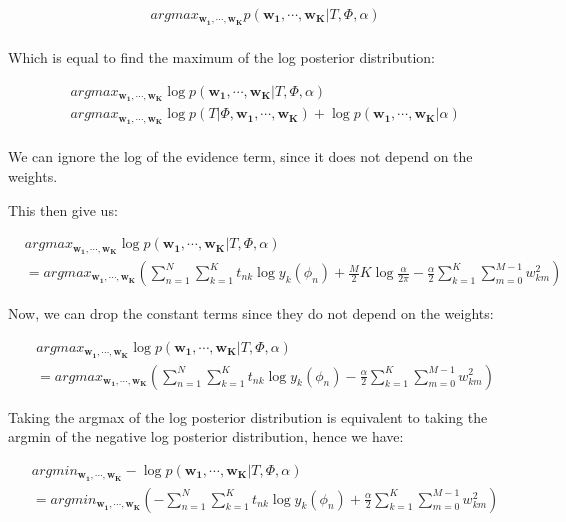 \documentclass[12pt,a4paper,oneside]{paper}
\begin{document}
\begin{align*}
    &argmax_{\bm{w_1}, \cdots, \bm{w_K}} p(\bm{w_1}, \cdots, \bm{w_K} | T, \Phi, \alpha) \\
\end{align*}

Which is equal to find the maximum of the log posterior distribution:

\begin{align*}
    &argmax_{\bm{w_1}, \cdots, \bm{w_K}} \log p(\bm{w_1}, \cdots, \bm{w_K} | T, \Phi, \alpha) \\
    &argmax_{\bm{w_1}, \cdots, \bm{w_K}} \log p(T | \Phi, \bm{w_1}, \cdots, \bm{w_K}) + \log p(\bm{w_1}, \cdots, \bm{w_K} | \alpha) \\
\end{align*}

We can ignore the log of the evidence term, since it does not depend on the weights.

This then give us: 

\begin{align*}
    &argmax_{\bm{w_1}, \cdots, \bm{w_K}} \log p(\bm{w_1}, \cdots, \bm{w_K} | T, \Phi, \alpha) \\
    &= argmax_{\bm{w_1}, \cdots, \bm{w_K}} \left(\sum_{n=1}^{N} \sum_{k=1}^{K} t_{nk} \log y_k(\phi_n) + \frac{M}{2} K \log \frac{\alpha}{2\pi} - \frac{\alpha}{2} \sum_{k=1}^{K} \sum_{m=0}^{M - 1} w_{km}^2\right)
\end{align*}


Now, we can drop the constant terms since they do not depend on the weights: 

\begin{align*}
    &argmax_{\bm{w_1}, \cdots, \bm{w_K}} \log p(\bm{w_1}, \cdots, \bm{w_K} | T, \Phi, \alpha) \\
    &= argmax_{\bm{w_1}, \cdots, \bm{w_K}} \left(\sum_{n=1}^{N} \sum_{k=1}^{K} t_{nk} \log y_k(\phi_n) - \frac{\alpha}{2} \sum_{k=1}^{K} \sum_{m=0}^{M - 1} w_{km}^2\right)
\end{align*}

Taking the argmax of the log posterior distribution is equivalent to taking the argmin of the negative log posterior distribution, hence we have:

\begin{align*}
    &argmin_{\bm{w_1}, \cdots, \bm{w_K}} -\log p(\bm{w_1}, \cdots, \bm{w_K} | T, \Phi, \alpha) \\
    &= argmin_{\bm{w_1}, \cdots, \bm{w_K}} \left(-\sum_{n=1}^{N} \sum_{k=1}^{K} t_{nk} \log y_k(\phi_n) + \frac{\alpha}{2} \sum_{k=1}^{K} \sum_{m=0}^{M - 1} w_{km}^2\right)
\end{align*}
\end{document}
